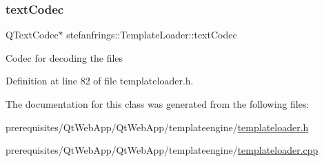 \subsubsection{\texorpdfstring{text\+Codec}{textCodec}}
{\footnotesize\ttfamily Q\+Text\+Codec$\ast$ stefanfrings\+::\+Template\+Loader\+::text\+Codec\hspace{0.3cm}{\ttfamily [protected]}}

Codec for decoding the files 

Definition at line 82 of file templateloader.\+h.



The documentation for this class was generated from the following files\+:\begin{DoxyCompactItemize}
\item 
prerequisites/\+Qt\+Web\+App/\+Qt\+Web\+App/templateengine/\mbox{\hyperlink{templateloader_8h}{templateloader.\+h}}\item 
prerequisites/\+Qt\+Web\+App/\+Qt\+Web\+App/templateengine/\mbox{\hyperlink{templateloader_8cpp}{templateloader.\+cpp}}\end{DoxyCompactItemize}
